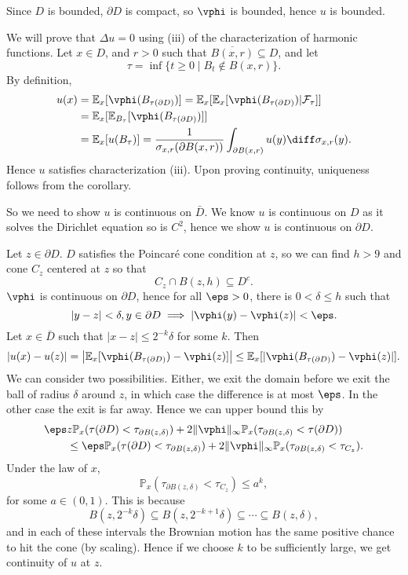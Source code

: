 \documentclass[12pt]{article}
\begin{document}
\begin{proofbox}
	Since $D$ is bounded, $\partial D$ is compact, so $\vphi$ is bounded, hence $u$ is bounded.

	We will prove that $\Delta u = 0$ using (iii) of the characterization of harmonic functions. Let $x \in D$, and $r > 0$ such that $\overline{B(x, r)} \subseteq D$, and let
	\[
		\tau = \inf\{t \geq 0 \mid B_t \not \in B(x, r)\}.
	\]
	By definition,
	\begin{align*}
		u(x) &= \mathbb{E}_x[\vphi(B_{\tau(\partial D)})] = \mathbb{E}_x[\mathbb{E}_x[\vphi(B_{\tau(\partial D)}) | \mathcal{F}_\tau]] \\
		     &= \mathbb{E}_x[ \mathbb{E}_{B_{\tau}}[\vphi(B_{\tau(\partial D)})]] \\
		     &= \mathbb{E}_x[u(B_\tau)] = \frac{1}{\sigma_{x, r}(\partial B(x, r))} \int_{\partial B(x, r)} u(y) \diff \sigma_{x, r}(y).
	\end{align*}
	Hence $u$ satisfies characterization (iii). Upon proving continuity, uniqueness follows from the corollary.

	So we need to show $u$ is continuous on $\bar D$. We know $u$ is continuous on $D$ as it solves the Dirichlet equation so is $C^2$, hence we show $u$ is continuous on $\partial D$.

	Let $z \in \partial D$. $D$ satisfies the Poincar\'e cone condition at $z$, so we can find $h > 9$ and cone $C_z$ centered at $z$ so that
	\[
	C_z \cap B(z, h) \subseteq D^{c}.
	\]
	$\vphi$ is continuous on $\partial D$, hence for all $\eps > 0$, there is $0 < \delta \leq h$ such that
	\[
	|y - z| < \delta, y \in \partial D \implies |\vphi(y) - \vphi(z)| < \eps.
	\]
	Let $x \in \bar D$ such that $|x - z| \leq 2^{-k} \delta$ for some $k$. Then
	\[
	|u(x) - u(z)| = \left| \mathbb{E}_x[\vphi(B_{\tau(\partial D)}) - \vphi(z)] \right| \leq \mathbb{E}_x[|\vphi(B_{\tau(\partial D)}) - \vphi(z)|].
	\]
	We can consider two possibilities. Either, we exit the domain before we exit the ball of radius $\delta$ around $z$, in which case the difference is at most $\eps$. In the other case the exit is far away. Hence we can upper bound this by
	\begin{align*}
		\eps &z\mathbb{P}_x(\tau (\partial D) < \tau_{\partial B(z, \delta)}) + 2 \|\vphi\|_\infty \mathbb{P}_x(\tau_{\partial B(z, \delta)} < \tau(\partial D)) \\
		     &\leq \eps \mathbb{P}_x(\tau(\partial D) < \tau_{\partial B(z, \delta)}) + 2 \|\vphi\|_\infty \mathbb{P}_x(\tau_{\partial B(z, \delta)} < \tau_{C_z}).
	\end{align*}
	Under the law of $x$,
	\[
	\mathbb{P}_x(\tau_{\partial B(z, \delta)} < \tau_{C_z}) \leq a^{k},
	\]
	for some $a \in (0, 1)$. This is because
	\[
	B(z, 2^{-k} \delta) \subseteq B(z, 2^{-k+1} \delta) \subseteq \cdots \subseteq B(z, \delta),
	\]
	and in each of these intervals the Brownian motion has the same positive chance to hit the cone (by scaling). Hence if we choose $k$ to be sufficiently large, we get continuity of $u$ at $z$.
\end{proofbox}
\end{document}
